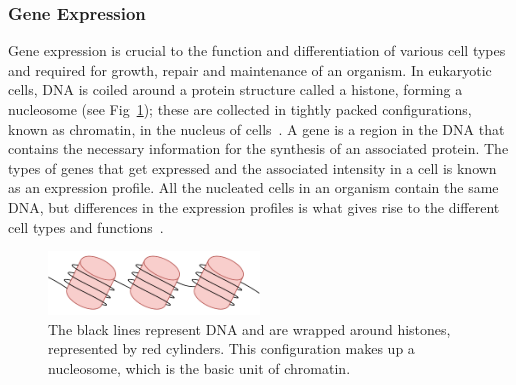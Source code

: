         \subsubsection{Gene Expression}
        Gene expression is crucial to the function and differentiation of various cell types and required for growth, repair and maintenance of an organism.  In eukaryotic cells, DNA is coiled around a protein structure called a histone, forming a nucleosome (see Fig~\ref{fig:chromatin1}); these are collected in tightly packed configurations, known as chromatin, in the nucleus of cells~\cite{alberts2002chromosomal, kornberg1974chromatin}. A gene is a region in the DNA that contains the necessary information for the synthesis of an associated protein. The types of genes that get expressed and the associated intensity in a cell is known as an expression profile. All the nucleated cells in an organism contain the same DNA, but differences in the expression profiles is what gives rise to the different cell types and functions~\cite{lockhart2000genomics}.%

        
            \begin{figure}[H]
                 \centering
            \includegraphics[width=0.5\textwidth]{Chromatin.pdf}
                \caption{The black lines represent DNA and are wrapped around histones, represented by red cylinders. This configuration makes up a nucleosome, which is the basic unit of chromatin.}
                \label{fig:chromatin1}
            \end{figure}
            

        
        
